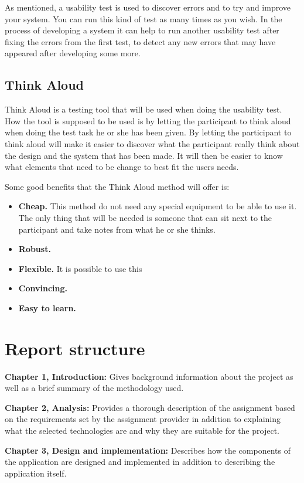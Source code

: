 As mentioned, a usability test is used to discover errors and to try and improve your system.\cite{usability-testing} You can run this kind of test as many times as you wish. In the process of developing a system it can help to run another usability test after fixing the errors from the first test, to detect any new errors that may have appeared after developing some more. %

\subsection{Think Aloud}
Think Aloud is a testing tool that will be used when doing the usability test. %
How the tool is supposed to be used is by letting the participant to think aloud when doing the test task he or she has been given. By letting the participant to think aloud will make it easier to discover what the participant really think about the design and the system that has been made. %
It will then be easier to know what elements that need to be change to best fit the users needs. 

Some good benefits that the Think Aloud method will offer is: %
\begin{itemize}
  \item \textbf{Cheap.} This method do not need any special equipment to be able to use it. The only thing that will be needed is someone that can sit next to the participant and take notes from what he or she thinks. 
  \item \textbf{Robust.}
  \item \textbf{Flexible.} It is possible to use this 
  \item \textbf{Convincing.}
  \item \textbf{Easy to learn.}
\end{itemize}

\section{Report structure}
\textbf{Chapter 1, Introduction:}
Gives background information about the project as well as a brief summary of the methodology used.

\textbf{Chapter 2, Analysis:}
Provides a thorough description of the assignment based on the requirements set by the assignment provider in addition to explaining what the selected technologies are and why they are suitable for the project.

\textbf{Chapter 3, Design and implementation:}
Describes how the components of the application are designed and implemented in addition to describing the application itself.

